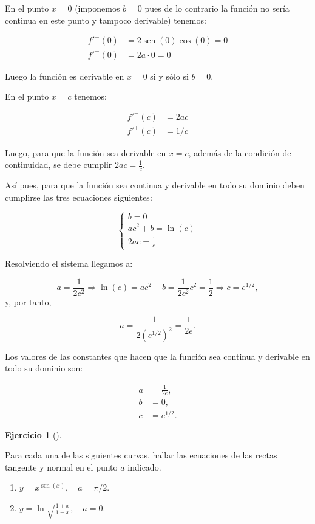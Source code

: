 \documentclass[
  a4paper,
]{scrreport}
\providecommand{\tightlist}{%
  \setlength{\itemsep}{0pt}\setlength{\parskip}{0pt}}\usepackage{longtable,booktabs,array}
\theoremstyle{definition}
\newtheorem{exercise}{Ejercicio}[chapter]
\theoremstyle{remark}
\begin{document}
\begin{tcolorbox}
En el punto \(x=0\) (imponemos \(b=0\) pues de lo contrario la función
no sería continua en este punto y tampoco derivable) tenemos:

\begin{align*}
f'^-(0) &= 2\operatorname{sen}(0)\cos(0) = 0\\
f'^+(0) &= 2a\cdot 0 = 0
\end{align*}

Luego la función es derivable en \(x=0\) si y sólo si \(b=0\).

En el punto \(x=c\) tenemos:

\begin{align*}
f'^-(c) &= 2ac \\
f'^+(c) &= 1/c
\end{align*}

Luego, para que la función sea derivable en \(x=c\), además de la
condición de continuidad, se debe cumplir \(2ac = \frac{1}{c}\).

Así pues, para que la función sea continua y derivable en todo su
dominio deben cumplirse las tres ecuaciones siguientes:

\[
\begin{cases}
b=0 \\
ac^2+b = \ln(c)\\
2ac = \frac 1c
\end{cases}
\]

Resolviendo el sistema llegamos a:

\[
a = \frac{1}{2c^2} \Rightarrow \ln(c) = ac^2+b = \frac{1}{2c^2}c^2 = \frac{1}{2} \Rightarrow c = e^{1/2},
\] y, por tanto,

\[
a = \frac{1}{2(e^{1/2})^2} = \frac{1}{2e}.
\]

Los valores de las constantes que hacen que la función sea continua y
derivable en todo su dominio son:

\begin{align*}
a &= \frac{1}{2e},\\
b &= 0, \\
c &= e^{1/2}.
\end{align*}

\end{tcolorbox}

\begin{exercise}[]\protect\hypertarget{exr-tangente-normal-1}{}\label{exr-tangente-normal-1}

Para cada una de las siguientes curvas, hallar las ecuaciones de las
rectas tangente y normal en el punto \(a\) indicado.

\begin{enumerate}
\def\labelenumi{\alph{enumi}.}
\tightlist
\item
  \(y=x^{\operatorname{sen}(x)},\quad a=\pi/2\).
\item
  \(y=\ln\sqrt{\frac{1+x}{1-x}}, \quad a=0\).
\end{enumerate}

\end{exercise}
\end{document}
